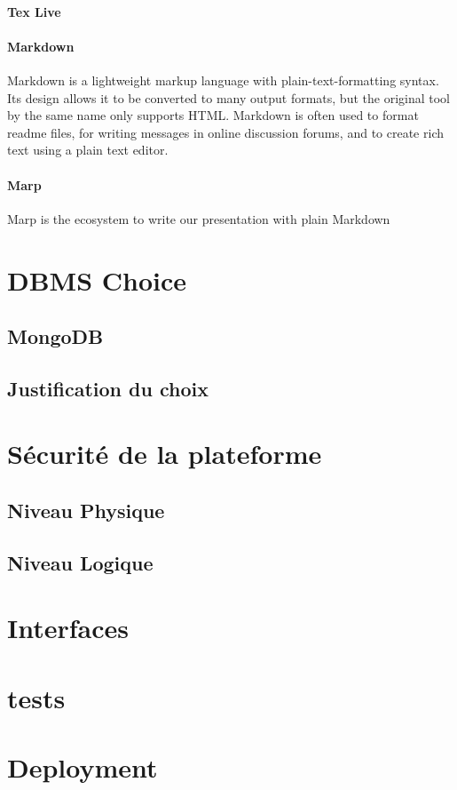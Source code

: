 \paragraph{Tex Live}



\paragraph{Markdown}
Markdown is a lightweight markup language with plain-text-formatting syntax. Its design allows it to be converted to many output formats, but the original tool by the same name only supports HTML. Markdown is often used to format readme files, for writing messages in online discussion forums, and to create rich text using a plain text editor.
\paragraph{Marp}
Marp is the ecosystem to write our presentation with plain Markdown
\section{DBMS Choice}
\subsection{MongoDB}
\subsection{Justification du choix}

\section{Sécurité de la plateforme}
\subsection{Niveau Physique}
\subsection{Niveau Logique}

\section{Interfaces}
\section{tests}
\section{Deployment}


